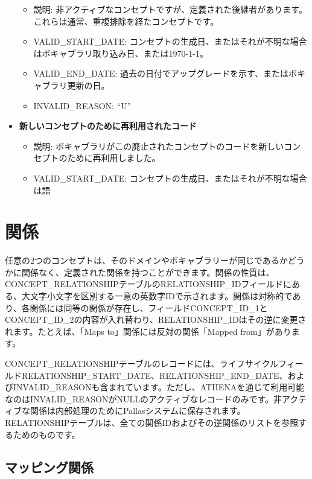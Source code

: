 \documentclass[
  11pt]{book}
\providecommand{\tightlist}{%
  \setlength{\itemsep}{0pt}\setlength{\parskip}{0pt}}
\theoremstyle{definition}
\theoremstyle{definition}
\theoremstyle{definition}
\theoremstyle{definition}
\theoremstyle{remark}
\begin{document}
\begin{itemize}
  \begin{itemize}
  \tightlist
  \item
    説明: 非アクティブなコンセプトですが、定義された後継者があります。これらは通常、重複排除を経たコンセプトです。
  \item
    VALID\_START\_DATE: コンセプトの生成日、またはそれが不明な場合はボキャブラリ取り込み日、または1970-1-1。
  \item
    VALID\_END\_DATE: 過去の日付でアップグレードを示す、またはボキャブラリ更新の日。
  \item
    INVALID\_REASON: ``U''
  \end{itemize}
\item
  \textbf{新しいコンセプトのために再利用されたコード}

  \begin{itemize}
  \tightlist
  \item
    説明: ボキャブラリがこの廃止されたコンセプトのコードを新しいコンセプトのために再利用しました。
  \item
    VALID\_START\_DATE: コンセプトの生成日、またはそれが不明な場合は語
  \end{itemize}
\end{itemize}

\section{関係}\label{ux95a2ux4fc2}

任意の2つのコンセプトは、そのドメインやボキャブラリーが同じであるかどうかに関係なく、定義された関係を持つことができます。関係の性質は、CONCEPT\_RELATIONSHIPテーブルのRELATIONSHIP\_IDフィールドにある、大文字小文字を区別する一意の英数字IDで示されます。関係は対称的であり、各関係には同等の関係が存在し、フィールドCONCEPT\_ID\_1とCONCEPT\_ID\_2の内容が入れ替わり、RELATIONSHIP\_IDはその逆に変更されます。たとえば、「Maps to」関係には反対の関係「Mapped from」があります。

CONCEPT\_RELATIONSHIPテーブルのレコードには、ライフサイクルフィールドRELATIONSHIP\_START\_DATE、RELATIONSHIP\_END\_DATE、およびINVALID\_REASONも含まれています。ただし、ATHENAを通じて利用可能なのはINVALID\_REASONがNULLのアクティブなレコードのみです。非アクティブな関係は内部処理のためにPallasシステムに保存されます。RELATIONSHIPテーブルは、全ての関係IDおよびその逆関係のリストを参照するためのものです。

\subsection{マッピング関係}\label{conceptMapping}
\end{document}
